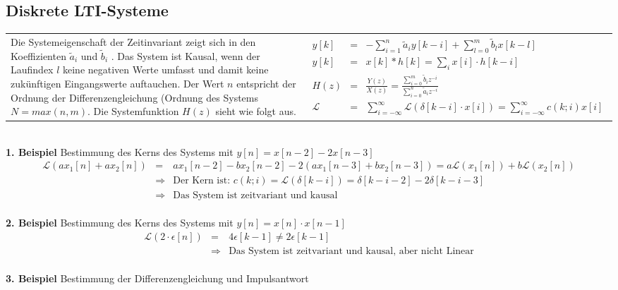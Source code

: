 \subsection{Diskrete LTI-Systeme}
\begin{tabular}{ll}
 \addtolength{\jot}{2mm}
 \parbox{5cm}{Die Systemeigenschaft der Zeitinvariant zeigt sich in den Koeffizienten $\tilde{a}_i$ und  $\tilde{b}_i$ . Das System ist Kausal, wenn der Laufindex $l$ keine negativen Werte umfasst und damit keine zukünftigen Eingangswerte auftauchen. Der Wert $n$ entspricht der Ordnung der Differenzengleichung (Ordnung des Systems $N = max(n,m)$. Die Systemfunktion $H(z)$ sieht wie folgt aus.
}
 &
 \addtolength{\jot}{2mm}
 \parbox{5cm}{
 \begin{eqnarray*}
 y[k] &=& - \sum_{i=1}^n \tilde{a}_i y[k-i] + \sum_{l=0}^m \tilde{b}_l x[k-l]\\
 y[k] &=& x[k] \ast h[k] = \sum_i x[i] \cdot h[k-i]\\
 H(z) &=& \frac{Y(z)}{X(z)} = \frac{\sum_{i=0}^m \tilde{b}_i z^{-i}}{\sum_{i=0}^n \tilde{a}_i z^{-i}}\\
 \mathcal{L} &=& \sum_{i=-\infty}^{\infty} \mathcal{L}(\delta[k-i] \cdot x[i]) = \sum_{i=-\infty}^{\infty} c(k;i) x[i]
 \end{eqnarray*}

}
\end{tabular}\\
\textbf{1. Beispiel} \quad Bestimmung des Kerns des Systems mit $y[n] = x[n-2]-2x[n-3]$
\begin{eqnarray*}
\mathcal{L}(ax_1[n] + ax_2[n]) &=& ax_1[n-2]-bx_2[n-2] - 2(ax_1[n-3] + bx_2[n-3]) = a\mathcal{L}(x_1[n]) + b\mathcal{L}(x_2[n]) \\[6pt]
&\Rightarrow& \text{Der Kern ist: } c(k;i) = \mathcal{L}(\delta[k-i]) = \delta[k-i-2] -2\delta[k-i-3]\\
&\Rightarrow& \text{Das System ist zeitvariant und kausal}
\end{eqnarray*}\\
\textbf{2. Beispiel} \quad Bestimmung des Kerns des Systems mit $y[n] = x[n] \cdot x[n-1]$
\begin{eqnarray*}
\mathcal{L}(2 \cdot \epsilon[n]) &=& 4\epsilon[k-1] \neq 2\epsilon[k-1]\\[6pt]
&\Rightarrow& \text{Das System ist zeitvariant und kausal, aber nicht Linear}
\end{eqnarray*}\\
\textbf{3. Beispiel} \quad Bestimmung der Differenzengleichung und Impulsantwort
